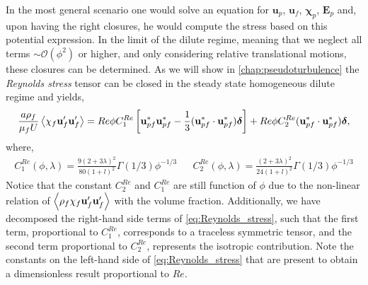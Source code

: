 In the most general scenario one would solve an equation for $\textbf{u}_p$, $\textbf{u}_f$, $\bm\chi_p$, $\textbf{E}_p$ and, upon having the right closures, he would compute the stress based on this potential expression. 
In the limit of the dilute regime, meaning that we neglect all terms $\sim \mathcal{O}(\phi^2)$ or higher, and only considering relative translational motions, these closures can be determined. 
As we will show in \ref{chap:pseudoturbulence} the \textit{Reynolds stress} tensor can be closed in the steady state homogeneous dilute regime and yields, 
\begin{equation}
    \frac{a \rho_f}{\mu_f U}\avg{\chi_f \textbf{u}_f'\textbf{u}'_f}
    = Re  \phi C^{Re}_1 \left[
        \textbf{u}_{pf}^*
        \textbf{u}_{pf}^*
        -\frac{1}{3}
        (\textbf{u}_{pf}^*
        \cdot\textbf{u}_{pf}^*)\bm\delta
    \right]
    + Re \phi C^{Re}_2 (\textbf{u}_{pf}^*\cdot\textbf{u}_{pf}^*) \bm\delta, 
    \label{eq:Reynolds_stress}
\end{equation}
where, 
\begin{align*}
    C^{Re}_1(\phi,\lambda)
    = 
        \frac{9(2+3\lambda)^2}{80(1+l)^2}\Gamma(1/3) \phi^{-1/3}
    && 
    C^{Re}_2(\phi,\lambda)
    = 
        \frac{(2+3\lambda)^2}{24(1+l)^2}\Gamma(1/3) \phi^{-1/3}
\end{align*}
Notice that the constant $C^{Re}_2$ and $C^{Re}_1$ are still function of $\phi$ due to the non-linear relation of $\left<\rho_f\chi_f\textbf{u}_f'\textbf{u}'_f\right>$ with the volume fraction. 
Additionally, we have decomposed the right-hand side terms of \ref{eq:Reynolds_stress}, such that the first term, proportional to $C^{Re}_1$, corresponds to a traceless symmetric tensor, and the second term proportional to $C^{Re}_2$, represents the isotropic contribution.  
Note the constants on the left-hand side of \ref{eq:Reynolds_stress} that are present to obtain a dimensionless result proportional to $Re$. 

